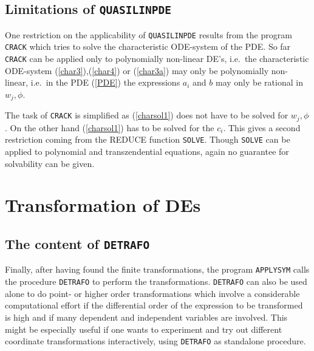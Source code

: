 \documentclass[12pt]{article}
\begin{document}
\subsection{Limitations of {\tt QUASILINPDE}}
One restriction on the applicability of {\tt QUASILINPDE} results from
the program {\tt CRACK} which tries to solve the
characteristic ODE-system of the PDE. So far {\tt CRACK} can be
applied only to polynomially non-linear DE's, i.e.\ the characteristic 
ODE-system (\ref{char3}),(\ref{char4}) or (\ref{char3a}) may
only be polynomially non-linear, i.e.\ in the PDE (\ref{PDE})
the expressions $a_i$ and $b$ may only be rational in $w_j,\phi$.

The task of {\tt CRACK} is simplified as (\ref{charsol1}) does not have to
be solved for $w_j, \phi$. On the other hand (\ref{charsol1}) has to be
solved for the $c_i$. This gives a 
second restriction coming from the REDUCE function {\tt SOLVE}.
Though {\tt SOLVE} can be applied
to polynomial and transzendential equations, again no guarantee for
solvability can be given.
\section{Transformation of DEs}
\subsection{The content of {\tt DETRAFO}}
Finally, after having found the finite transformations,
the program {\tt APPLYSYM} calls the procedure
{\tt DETRAFO} to perform the transformations. {\tt DETRAFO}
can also be used alone to do point- or higher order transformations
which involve a considerable computational effort if the
differential order of the expression to be transformed is high and
if many dependent and independent variables are involved.
This might be especially useful if one wants to experiment
and try out different coordinate transformations interactively,
using {\tt DETRAFO} as standalone procedure.
\end{document}
